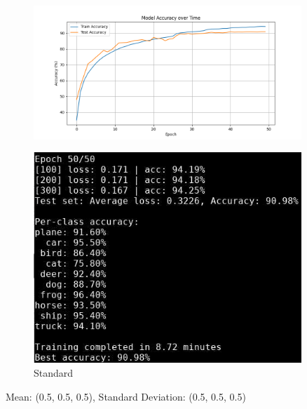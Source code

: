 \begin{frame}
\begin{columns}
    \begin{column}{0.4\textwidth}
        \vspace{-0.1cm}
        \begin{figure}[t]
            \centering
            \vspace{-0.4cm}
            \includegraphics[width=0.9\textwidth]{media/1stAssignment/cifar10_cnn_std_accuracy.png}
        \end{figure}
        \vspace{-0.6cm}
        \begin{figure}[t]
            \centering
            \includegraphics[width=0.9\textwidth]{media/1stAssignment/cnn_std_epoch_50.png}
            \vspace{-0.3cm}
            \caption{Standard}
        \end{figure}
        \vspace{-0.6cm}
        \center \tiny Mean: (0.5, 0.5, 0.5),
        \vspace{-0.3cm}
        \center \tiny Standard Deviation: (0.5, 0.5, 0.5)
    \end{column}


\end{columns}
\end{frame}
